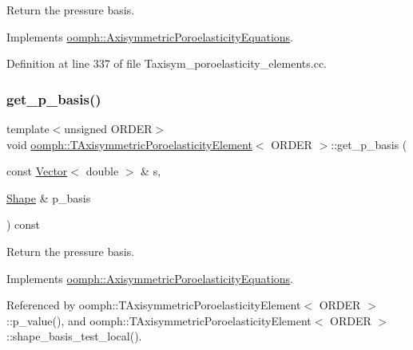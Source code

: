Return the pressure basis. 



Implements \hyperlink{classoomph_1_1AxisymmetricPoroelasticityEquations_ae3a7d5fd68eb6c68770d7783013bda19}{oomph\+::\+Axisymmetric\+Poroelasticity\+Equations}.



Definition at line 337 of file Taxisym\+\_\+poroelasticity\+\_\+elements.\+cc.

\mbox{\label{classoomph_1_1TAxisymmetricPoroelasticityElement_a12e958b84334c6e47e0511ff1f08f13d}} 
\subsubsection{\texorpdfstring{get\+\_\+p\+\_\+basis()}{get\_p\_basis()}\hspace{0.1cm}{\footnotesize\ttfamily [3/3]}}
{\footnotesize\ttfamily template$<$unsigned O\+R\+D\+ER$>$ \\
void \hyperlink{classoomph_1_1TAxisymmetricPoroelasticityElement}{oomph\+::\+T\+Axisymmetric\+Poroelasticity\+Element}$<$ O\+R\+D\+ER $>$\+::get\+\_\+p\+\_\+basis (\begin{DoxyParamCaption}\item[{const \hyperlink{classoomph_1_1Vector}{Vector}$<$ double $>$ \&}]{s,  }\item[{\hyperlink{classoomph_1_1Shape}{Shape} \&}]{p\+\_\+basis }\end{DoxyParamCaption}) const\hspace{0.3cm}{\ttfamily [virtual]}}



Return the pressure basis. 



Implements \hyperlink{classoomph_1_1AxisymmetricPoroelasticityEquations_ae3a7d5fd68eb6c68770d7783013bda19}{oomph\+::\+Axisymmetric\+Poroelasticity\+Equations}.



Referenced by oomph\+::\+T\+Axisymmetric\+Poroelasticity\+Element$<$ O\+R\+D\+E\+R $>$\+::p\+\_\+value(), and oomph\+::\+T\+Axisymmetric\+Poroelasticity\+Element$<$ O\+R\+D\+E\+R $>$\+::shape\+\_\+basis\+\_\+test\+\_\+local().

